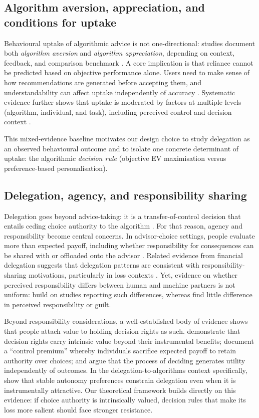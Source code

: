 \documentclass[a4paper, 12pt, fleqn]{article}
\theoremstyle{hypstyle}
\begin{document}
\subsection{Algorithm aversion, appreciation, and conditions for uptake}
Behavioural uptake of algorithmic advice is not one-directional: studies document both \emph{algorithm aversion} and \emph{algorithm appreciation}, depending on context, feedback, and comparison benchmark \citep{Dietvorst2018,Logg2019}. A core implication is that reliance cannot be predicted based on objective performance alone. Users need to make sense of how recommendations are generated before accepting them, and understandability can affect uptake independently of accuracy \citep{Yeomans2019}. Systematic evidence further shows that uptake is moderated by factors at multiple levels (algorithm, individual, and task), including perceived control and decision context \citep{Mahmud2022,Chugunova2022}.

This mixed-evidence baseline motivates our design choice to study delegation as an observed behavioural outcome and to isolate one concrete determinant of uptake: the algorithmic \emph{decision rule} (objective EV maximisation versus preference-based personalisation).

\subsection{Delegation, agency, and responsibility sharing}
Delegation goes beyond advice-taking: it is a transfer-of-control decision that entails ceding choice authority to the algorithm \citep{Candrian2022}. For that reason, agency and responsibility become central concerns. In advisor-choice settings, people evaluate more than expected payoff, including whether responsibility for consequences can be shared with or offloaded onto the advisor \citep{Gazit2023}. Related evidence from financial delegation suggests that delegation patterns are consistent with responsibility-sharing motivations, particularly in loss contexts \citep{Werner2026}. Yet, evidence on whether perceived responsibility differs between human and machine partners is not uniform: \citet{Gazit2023} build on studies reporting such differences, whereas \citet{Kirchkamp2019} find little difference in perceived responsibility or guilt.

Beyond responsibility considerations, a well-established body of evidence shows that people attach value to holding decision rights as such. \citet{Bartling2014} demonstrate that decision rights carry intrinsic value beyond their instrumental benefits; \citet{Owens2014} document a ``control premium'' whereby individuals sacrifice expected payoff to retain authority over choices; and \citet{FreyBenzStutzer2004} argue that the process of deciding generates utility independently of outcomes. In the delegation-to-algorithms context specifically, \citet{Ivanova-Stenzel2025} show that stable autonomy preferences constrain delegation even when it is instrumentally attractive. Our theoretical framework builds directly on this evidence: if choice authority is intrinsically valued, decision rules that make its loss more salient should face stronger resistance.
\end{document}
